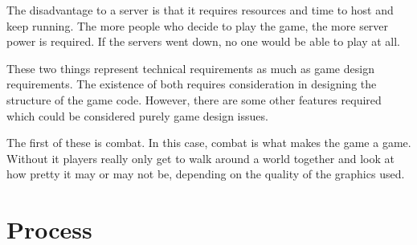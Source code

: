 The disadvantage to a server is that it requires resources and time to host and keep running. The more people who decide to play the game, the more server power is required. If the servers went down, no one would be able to play at all.

These two things represent technical requirements as much as game design requirements. The existence of both requires consideration in designing the structure of the game code. However, there are some other features required which could be considered purely game design issues.

The first of these is combat. In this case, combat is what makes the game a game. Without it players really only get to walk around a world together and look at how pretty it may or may not be, depending on the quality of the graphics used.





\section{Process}

